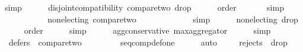\begin{isabellebody}
\ simp\ \isanewline
\ \ \isamarkupfalse%
\ {}{}{}{\isacharcolon}{\kern0pt}\ {\isachardoublequoteopen}disjoint{\isacharunderscore}{\kern0pt}compatibility\ {\isacharquery}{\kern0pt}compare{\isacharunderscore}{\kern0pt}two\ {\isacharquery}{\kern0pt}drop{}{\isachardoublequoteclose}\isanewline
\ \ \ \ \isamarkupfalse%
\ order\ {}{}{}{}\isanewline
\ \ \ \ \isamarkupfalse%
\ simp\isanewline
\ \ \ \ \ \ \isanewline
\ \ \isamarkupfalse%
\ {}{}{}{\isacharcolon}{\kern0pt}\ {\isachardoublequoteopen}non{\isacharunderscore}{\kern0pt}electing\ {\isacharquery}{\kern0pt}compare{\isacharunderscore}{\kern0pt}two{\isachardoublequoteclose}\isanewline
\ \ \ \ \isamarkupfalse%
\ {}{}{}{}\ {}{}{}{}\isanewline
\ \ \ \ \isamarkupfalse%
\ simp\ \isanewline
\ \ \isamarkupfalse%
\ {}{}{}{\isacharcolon}{\kern0pt}\ {\isachardoublequoteopen}non{\isacharunderscore}{\kern0pt}electing\ {\isacharquery}{\kern0pt}drop{}{\isachardoublequoteclose}\isanewline
\ \ \ \ \isamarkupfalse%
\ order\isanewline
\ \ \ \ \isamarkupfalse%
\ simp\ \isanewline
\ \ \isamarkupfalse%
\ {}{}{}{\isacharcolon}{\kern0pt}\ {\isachardoublequoteopen}agg{\isacharunderscore}{\kern0pt}conservative\ max{\isacharunderscore}{\kern0pt}aggregator{\isachardoublequoteclose}\isanewline
\ \ \ \ \isamarkupfalse%
\ simp\ \isanewline
\ \ \isamarkupfalse%
\ {}{}{}{\isacharcolon}{\kern0pt}\ {\isachardoublequoteopen}defers\ {}\ {\isacharquery}{\kern0pt}compare{\isacharunderscore}{\kern0pt}two{\isachardoublequoteclose}\isanewline
\ \ \ \ \isamarkupfalse%
\ {}{}{}{}\ {}{}{}{}\ {}{}{}{}\ seq{\isacharunderscore}{\kern0pt}comp{\isacharunderscore}{\kern0pt}def{\isacharunderscore}{\kern0pt}one\isanewline
\ \ \ \ \isamarkupfalse%
\ auto\isanewline
\ \ \isamarkupfalse%
\ {}{}{}{\isacharcolon}{\kern0pt}\ {\isachardoublequoteopen}rejects\ {}\ {\isacharquery}{\kern0pt}drop{}{\isachardoublequoteclose}\isanewline

\end{isabellebody}
